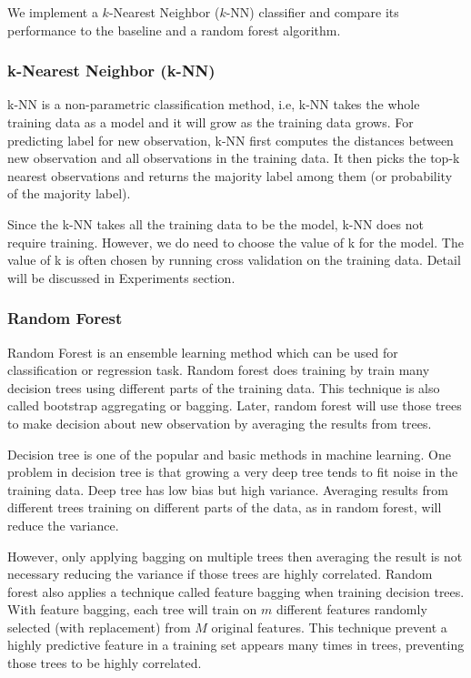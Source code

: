 We implement a $k$-Nearest Neighbor ($k$-NN) classifier and compare its
performance to the baseline and a random forest algorithm.

\subsubsection{k-Nearest Neighbor (k-NN)}
k-NN is a non-parametric classification method, i.e, k-NN takes the whole training data as a model and it will grow as the training data grows. For predicting label for new observation, k-NN first computes the distances between new observation and all observations in the training data. It then picks the top-k nearest observations and returns the majority label among them (or probability of the majority label).

Since the k-NN takes all the training data to be the model, k-NN does not require training. However, we do need to choose the value of k for the model. The value of k is often chosen by running cross validation on the training data. Detail will be discussed in Experiments section.

\subsubsection{Random Forest}
Random Forest is an ensemble learning method which can be used for classification or regression task. Random forest does training by train many decision trees using different parts of the training data. This technique is also called bootstrap aggregating or bagging. Later, random forest will use those trees to make decision about new observation by averaging the results from trees.

Decision tree is one of the popular and basic methods in machine learning. One problem in decision tree is that growing a very deep tree tends to fit noise in the training data. Deep tree has low bias but high variance. Averaging results from different trees training on different parts of the data, as in random forest, will reduce the variance.

However, only applying bagging on multiple trees then averaging the result is not necessary reducing the variance if those trees are highly correlated. Random forest also applies a technique called feature bagging when training decision trees. With feature bagging, each tree will train on $m$ different features randomly selected (with replacement) from $M$ original features. This technique prevent a highly predictive feature in a training set appears many times in trees, preventing those trees to be highly correlated.

